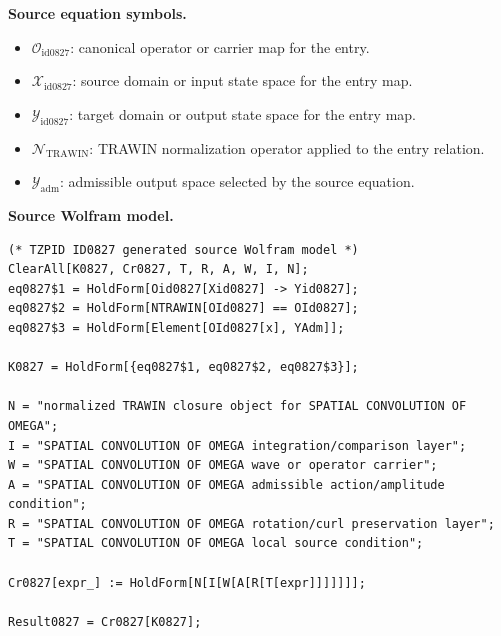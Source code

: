 \begin{minipage}[t]{0.49\linewidth}
\begingroup
\small
\raggedright
\textbf{Source equation symbols.}\par
\begin{itemize}[leftmargin=1.35em,itemsep=1pt,topsep=1pt,parsep=0pt]
    \item $\mathcal{O}_{\mathrm{id0827}}$: canonical operator or carrier map for the entry.
    \item $\mathcal{X}_{\mathrm{id0827}}$: source domain or input state space for the entry map.
    \item $\mathcal{Y}_{\mathrm{id0827}}$: target domain or output state space for the entry map.
    \item $\mathcal{N}_{\mathrm{TRAWIN}}$: TRAWIN normalization operator applied to the entry relation.
    \item $\mathcal{Y}_{\mathrm{adm}}$: admissible output space selected by the source equation.
\end{itemize}
\endgroup
\end{minipage}\hfill
\begin{minipage}[t]{0.47\linewidth}
\begingroup
\scriptsize
\raggedright
\textbf{Source Wolfram model.}\par
\begin{Verbatim}[fontsize=\tiny,breaklines=true,breakanywhere=true]
(* TZPID ID0827 generated source Wolfram model *)
ClearAll[K0827, Cr0827, T, R, A, W, I, N];
eq0827$1 = HoldForm[Oid0827[Xid0827] -> Yid0827];
eq0827$2 = HoldForm[NTRAWIN[OId0827] == OId0827];
eq0827$3 = HoldForm[Element[OId0827[x], YAdm]];

K0827 = HoldForm[{eq0827$1, eq0827$2, eq0827$3}];

N = "normalized TRAWIN closure object for SPATIAL CONVOLUTION OF OMEGA";
I = "SPATIAL CONVOLUTION OF OMEGA integration/comparison layer";
W = "SPATIAL CONVOLUTION OF OMEGA wave or operator carrier";
A = "SPATIAL CONVOLUTION OF OMEGA admissible action/amplitude condition";
R = "SPATIAL CONVOLUTION OF OMEGA rotation/curl preservation layer";
T = "SPATIAL CONVOLUTION OF OMEGA local source condition";

Cr0827[expr_] := HoldForm[N[I[W[A[R[T[expr]]]]]]];

Result0827 = Cr0827[K0827];
\end{Verbatim}
\endgroup
\end{minipage}

